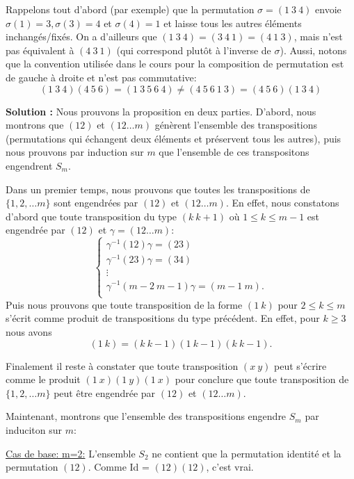 \documentclass[11pt]{article} %
\newenvironment{solution}[1][\unskip]{%
	\par
	\noindent
	\textbf{Solution #1:}
	\noindent}
{\medskip}
\begin{document}
Rappelons tout d'abord (par exemple) que la permutation $\sigma = (1\ 3 \ 4)$ envoie $\sigma(1)=3, \sigma(3)=4$ et $\sigma(4)=1$ et laisse tous les autres  éléments inchangés/fixés. On a d'ailleurs que $(1\ 3\ 4)= (3 \ 4 \ 1) = (4\ 1 \ 3)$, mais n'est pas équivalent à $(4\ 3\ 1)$ (qui correspond plutôt à l'inverse de $\sigma$). Aussi, notons que la convention utilisée dans le cours pour la composition de permutation est de gauche à droite et n'est pas commutative: $$(1\ 3 \ 4) (4\ 5\ 6) = (1 \ 3 \ 5 \ 6 \ 4) \neq (4\ 5\ 6\ 1\ 3) = (4\ 5\ 6)(1\ 3\ 4) $$
\begin{solution}
Nous prouvons la proposition en deux parties. D'abord, nous montrons que $(12)$ et $(1 2 \dots m)$ génèrent l'ensemble des transpositions (permutations qui échangent deux éléments et préservent tous les autres), puis nous prouvons par induction sur $m$ que l'ensemble de ces transpositons engendrent $S_m$.


Dans un premier temps, nous prouvons que toutes les transpositions de $\{1,2,\dots m\}$ sont engendrées par $(12)$ et $(12\dots m)$. En effet, nous constatons d'abord que toute transposition du type $(k \ k+1)$ où $1\leq k \leq m-1$ est engendrée par $(12)$ et $\gamma=(12\dots m)$:
\begin{equation*}
\left\{
\begin{array}{l}
\gamma^{-1} (12)\gamma = (23) \\
\gamma^{-1} (23)\gamma = (34) \\
\vdots\\
\gamma^{-1} (m-2 \ m-1)\gamma = (m-1 \ m). \\
\end{array} \right.
\end{equation*}
Puis nous prouvons que toute transposition de la forme $(1\ k)$ pour $2\leq k \leq m$ s'écrit comme produit de transpositions du type précédent. En effet, pour $k\geq 3$ nous avons $$(1\ k)=(k\ k-1)(1\ k-1)(k\ k-1).$$

Finalement il reste à constater que toute transposition $(x\ y)$ peut s'écrire comme le produit $(1\ x)(1\ y)(1\ x)$ pour conclure que toute transposition de $\{1,2,\dots m\}$ peut être engendrée par $(12)$ et $(12\dots m)$.
\end{solution}


Maintenant, montrons que l'ensemble des transpositions engendre $S_m$ par induciton sur $m$: 


\underline{Cas de base: m=2:} L'ensemble $S_2$ ne contient que la permutation identité et la permutation $(12)$. Comme Id = $(12)(12)$, c'est vrai.
\end{document}
